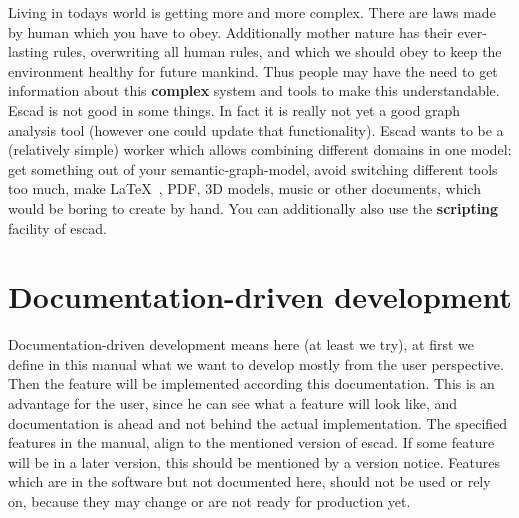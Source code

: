 \documentclass[a4paper, 12pt, openany]{scrbook}
\begin{document}
Living in todays world is getting more and more complex. There are laws made by human which you have to obey. Additionally mother nature has their ever-lasting rules, overwriting all human rules, and which we should obey to keep the environment healthy for future mankind. Thus people may have the need to get information about this \textbf{complex} system and tools to make this understandable. Escad is not good in some things. In fact it is really not yet a good graph analysis tool (however one could update that functionality). Escad wants to be a (relatively simple) worker which allows combining different domains in one model: get something out of your semantic-graph-model, avoid switching different tools too much, make \LaTeX\ , PDF, 3D models, music or other documents, which would be boring to create by hand. You can additionally also use the \textbf{scripting} facility of escad.
\section{Documentation-driven development}\label{sec:ddd}
Documentation-driven development means here (at least we try), at first we define in this manual what we want to develop mostly from the user perspective. Then the feature will be implemented according this documentation. This is an advantage for the user, since he can see what a feature will look like, and documentation is ahead and not behind the actual implementation. The specified features in the manual, align to the mentioned version of escad. If some feature will be in a later version, this should be mentioned by a version notice. Features which are in the software but not documented here, should not be used or rely on, because they may change or are not ready for production yet.
\end{document}
